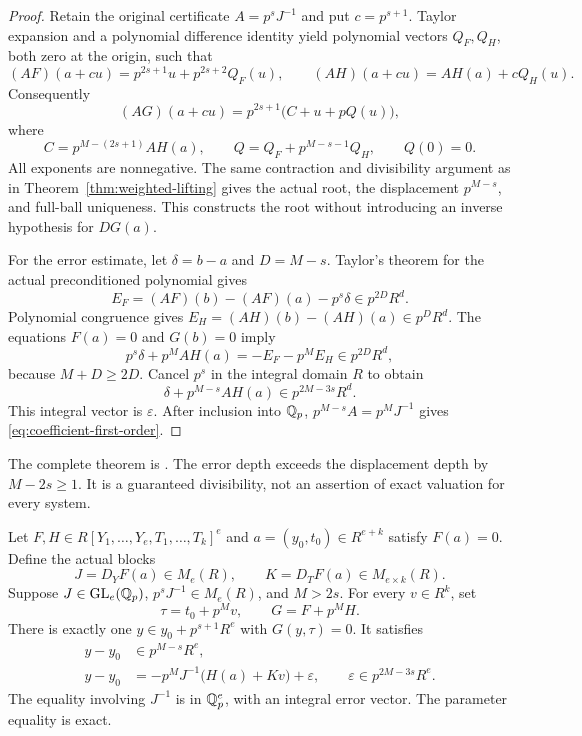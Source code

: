 \begin{proof}
Retain the original certificate $A=p^sJ^{-1}$ and put $c=p^{s+1}$.
Taylor expansion and a polynomial difference identity yield polynomial
vectors $Q_F,Q_H$, both zero at the origin, such that
\[
 (AF)(a+cu)=p^{2s+1}u+p^{2s+2}Q_F(u),\qquad
 (AH)(a+cu)=AH(a)+cQ_H(u).
\]
Consequently
\[
 (AG)(a+cu)=p^{2s+1}\bigl(C+u+pQ(u)\bigr),
\]
where
\[
 C=p^{M-(2s+1)}AH(a),\qquad
 Q=Q_F+p^{M-s-1}Q_H,\qquad Q(0)=0.
\]
All exponents are nonnegative. The same contraction and divisibility
argument as in Theorem~\ref{thm:weighted-lifting} gives the actual root,
the displacement $p^{M-s}$, and full-ball uniqueness. This constructs the
root without introducing an inverse hypothesis for $DG(a)$.

For the error estimate, let $\delta=b-a$ and $D=M-s$. Taylor's theorem
for the actual preconditioned polynomial gives
\[
 E_F=(AF)(b)-(AF)(a)-p^s\delta\in p^{2D}R^d.
\]
Polynomial congruence gives
$E_H=(AH)(b)-(AH)(a)\in p^DR^d$.
The equations $F(a)=0$ and $G(b)=0$ imply
\[
 p^s\delta+p^MAH(a)=-E_F-p^ME_H\in p^{2D}R^d,
\]
because $M+D\ge2D$. Cancel $p^s$ in the integral domain $R$ to obtain
\[
 \delta+p^{M-s}AH(a)\in p^{2M-3s}R^d.
\]
This integral vector is $\varepsilon$. After inclusion into $\mathbb Q_p$,
$p^{M-s}A=p^MJ^{-1}$ gives \eqref{eq:coefficient-first-order}.
\end{proof}

The complete theorem is
.
The error depth exceeds the displacement depth by $M-2s\ge1$. It is a
guaranteed divisibility, not an assertion of exact valuation for every
system.

\begin{theorem}
\label{thm:joint-deformation}
Let $F,H\in R[Y_1,\ldots,Y_e,T_1,\ldots,T_k]^e$ and
$a=(y_0,t_0)\in R^{e+k}$ satisfy $F(a)=0$. Define the actual blocks
\[
 J=D_YF(a)\in M_e(R),\qquad K=D_TF(a)\in M_{e\times k}(R).
\]
Suppose $J\in\operatorname{GL}_e(\mathbb Q_p)$,
$p^sJ^{-1}\in M_e(R)$, and $M>2s$. For every $v\in R^k$, set
\[
 \tau=t_0+p^Mv,\qquad G=F+p^MH.
\]
There is exactly one $y\in y_0+p^{s+1}R^e$ with $G(y,\tau)=0$.
It satisfies
\begin{equation}\label{eq:joint-first-order}
 \begin{aligned}
  y-y_0&\in p^{M-s}R^e,\\
  y-y_0&=-p^MJ^{-1}\bigl(H(a)+Kv\bigr)+\varepsilon,
  \qquad\varepsilon\in p^{2M-3s}R^e.
 \end{aligned}
\end{equation}
The equality involving $J^{-1}$ is in $\mathbb Q_p^e$, with an integral error
vector. The parameter equality is exact.
\end{theorem}

